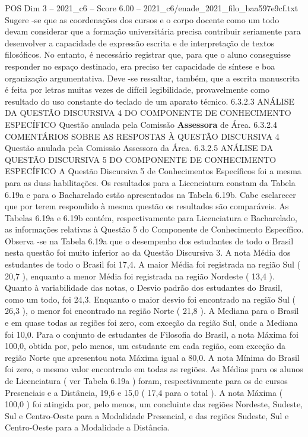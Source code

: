 \begin{textsample}{POS Dim 3 – 2021\_c6 – Score 6.00 – 2021\_c6/enade\_2021\_filo\_baa597e9cf.txt}
Sugere -se que as coordenações dos cursos e o corpo docente como um todo devam considerar que a formação universitária precisa contribuir seriamente para desenvolver a capacidade de expressão escrita e de interpretação de textos filosóficos.
No entanto, é necessário registrar que, para que o aluno conseguisse responder no espaço destinado, era preciso ter capacidade de síntese e boa organização argumentativa.
Deve -se ressaltar, também, que a escrita manuscrita é feita por letras muitas vezes de difícil legibilidade, provavelmente como resultado do uso constante do teclado de um aparato técnico. 6.3.2.3 ANÁLISE DA QUESTÃO DISCURSIVA 4 DO COMPONENTE DE CONHECIMENTO ESPECÍFICO Questão anulada pela Comissão \textbf{Assessora} de Área. 6.3.2.4 COMENTÁRIOS SOBRE AS RESPOSTAS À QUESTÃO DISCURSIVA 4 Questão anulada pela Comissão Assessora da Área. 6.3.2.5 ANÁLISE DA QUESTÃO DISCURSIVA 5 DO COMPONENTE DE CONHECIMENTO ESPECÍFICO A Questão Discursiva 5 de Conhecimentos Específicos foi a mesma para as duas habilitações.
Os resultados para a Licenciatura constam da Tabela 6.19a e para o Bacharelado estão apresentados na Tabela 6.19b.
Cabe esclarecer que por terem respondido à mesma questão os resultados são comparáveis.
As Tabelas 6.19a e 6.19b contém, respectivamente para Licenciatura e Bacharelado, as informações relativas à Questão 5 do Componente de Conhecimento Específico.
Observa -se na Tabela 6.19a que o desempenho dos estudantes de todo o Brasil nesta questão foi muito inferior ao da Questão Discursiva 3.
A nota Média dos estudantes de todo o Brasil foi 17,4.
A maior Média foi registrada na região Sul ( 20,7 ), enquanto a menor Média foi registrada na região Nordeste ( 13,4 ).
Quanto à variabilidade das notas, o Desvio padrão dos estudantes do Brasil, como um todo, foi 24,3.
Enquanto o maior desvio foi encontrado na região Sul ( 26,3 ), o menor foi encontrado na região Norte ( 21,8 ).
A Mediana para o Brasil e em quase todas as regiões foi zero, com exceção da região Sul, onde a Mediana foi 10,0.
Para o conjunto de estudantes de Filosofia do Brasil, a nota Máxima foi 100,0, obtida por, pelo menos, um estudante em cada região, com exceção da região Norte que apresentou nota Máxima igual a 80,0.
A nota Mínima do Brasil foi zero, o mesmo valor encontrado em todas as regiões.
As Médias para os alunos de Licenciatura ( ver Tabela 6.19a ) foram, respectivamente para os de cursos Presenciais e a Distância, 19,6 e 15,0 ( 17,4 para o total ).
A nota Máxima ( 100,0 ) foi atingida por, pelo menos, um concluinte das regiões Nordeste, Sudeste, Sul e Centro-Oeste para a Modalidade Presencial, e das regiões Sudeste, Sul e Centro-Oeste para a Modalidade a Distância.

\end{textsample}
